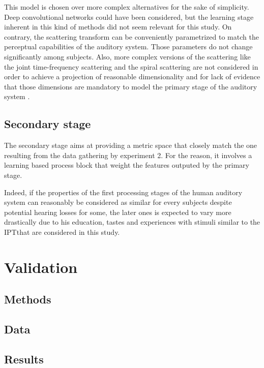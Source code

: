 \documentclass{article}
\newcommand{\ipt}{IPT}
\begin{document}
This model is chosen over more complex alternatives for the sake of simplicity. Deep convolutional networks could have been considered, but the learning stage inherent in this kind of methods did not seem relevant for this study. On contrary, the scattering transform can be conveniently parametrized to match the perceptual capabilities of the auditory system. Those parameters do not change significantly among subjects. Also, more complex versions of the scattering like the joint time-frequency scattering \cite{waspaa} and the spiral scattering are not considered in order to achieve a projection of reasonable dimensionality and for lack of evidence that those dimensions are mandatory to model the primary stage of the auditory system \cite{dau}.

\subsection{Secondary stage}

The secondary stage aims at providing a metric space that closely match the one resulting from the data gathering by experiment 2. For the reason, it involves a learning based process block that weight the features outputed by the primary stage.

Indeed, if the properties of the first processing stages of the human auditory system can reasonably be considered as similar for every subjects despite potential hearing losses for some, the later ones is expected to vary more drastically due to his education, tastes and experiences with stimuli similar to the \ipt that are considered in this study.



\section{Validation}\label{sec:validation}

\subsection{Methods}

\subsection{Data}

\subsection{Results}
\end{document}
